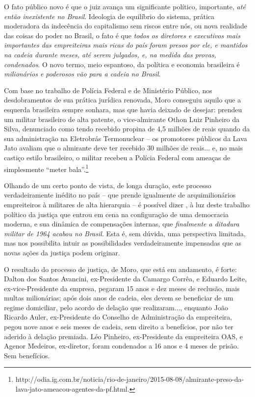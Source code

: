 O fato público novo é que o juiz avança um significante político,
importante, \emph{até então inexistente no Brasil}. Ideologia de
equilíbrio do sistema, prática moderadora da indecência do capitalismo
sem riscos entre nós, ou nova realidade das coisas do poder no Brasil, o
fato é que \emph{todos os diretores e executivos mais importantes das
empreiteiras mais ricas do país foram presos por ele, e mantidos na
cadeia durante meses, até serem julgados, e, na medida das provas,
condenados}. O novo termo, meio espantoso, da política e economia
brasileira é \emph{milionários e poderosos vão para a cadeia no Brasil}.

Com base no trabalho de Polícia Federal e de Ministério Público, nos
desdobramentos de sua prática jurídica renovada, Moro conseguiu aquilo
que a esquerda brasileira sempre sonhara, mas que havia deixado de
desejar: prendeu um militar brasileiro de alta patente, o vice-almirante
Othon Luiz Pinheiro da Silva, denunciado como tendo recebido propina de
4,5 milhões de reais quando da sua administração na Eletrobrás
Termonuclear -- os promotores públicos da Lava Jato avaliam que o
almirante deve ter recebido 30 milhões de reais... e, no mais castiço
estilo brasileiro, o militar recebeu a Polícia Federal com ameaças de
simplesmente ``meter bala''.\footnote{http://odia.ig.com.br/noticia/rio-de-janeiro/2015-08-08/almirante-preso-da-lava-jato-ameacou-agentes-da-pf.html.}

Olhando de um certo ponto de vista, de longa duração, este processo
verdadeiramente inédito no país -- que prende igualmente de
arquimilionários empreiteiros à militares de alta hierarquia -- é
possível dizer , à luz deste trabalho político da justiça que entrou em
cena na configuração de uma democracia moderna, e sua dinâmica de
compensações internas, que \emph{finalmente a ditadura militar de 1964
acabou no Brasil}. Esta é, sem dúvida, uma perspectiva limitada, mas nos
possibilita intuir as possibilidades verdadeiramente impensadas que as
novas ações da justiça podem originar.

O resultado do processo de justiça, de Moro, que está em andamento, é
forte: Dalton dos Santos Avancini, ex-Presidente da Camargo Corrêa, e
Eduardo Leite, ex-vice-Presidente da empresa, pegaram 15 anos e dez
meses de reclusão, mais multas milionárias; após dois anos de cadeia,
eles devem se beneficiar de um regime domiciliar, pelo acordo de delação
que realizaram..., enquanto João Ricardo Auler, ex-Presidente do
Conselho de Administração da empreiteira, pegou nove anos e seis meses
de cadeia, sem direito a benefícios, por não ter aderido à delação
premiada. Léo Pinheiro, ex-Presidente da empreiteira OAS, e Agenor
Medeiros, ex-diretor, foram condenados a 16 anos e 4 meses de prisão.
Sem benefícios.

